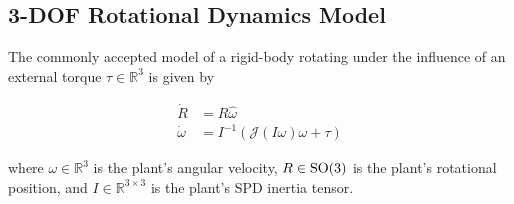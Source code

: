 \subsection{3-\acs{DOF} Rotational Dynamics Model}
\label{chModels.sec.SO3plant}


The commonly accepted model of a rigid-body rotating under the
influence of an external torque $\tau \in \mathbb{R}^{3}$ is given by

\begin{align} \label{chModels.eq.SO3plant}
\dot{R} &=R\widehat{\omega}                         \nonumber \\
\dot{\omega} &=I^{-1}\left(\mathcal{J}\left(I\omega\right)\omega+\tau\right) 
\end{align}

\noindent where $\omega \in \mathbb{R}^{3}$ is the plant's angular
velocity, $R\in\SO3$ is the plant's rotational position, and
$I\in\mathbb{R}^{3\times 3}$ is the plant's \ac{SPD} inertia
tensor\cite{Taylor2005}. 


